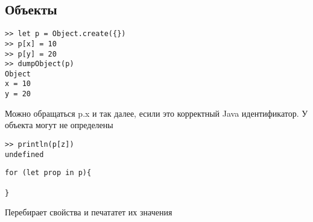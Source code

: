 \subsection{Объекты}

\begin{verbatim}
>> let p = Object.create({})
>> p[x] = 10
>> p[y] = 20
>> dumpObject(p)
Object
x = 10 
y = 20
\end{verbatim}

Можно обращаться p.x  и так далее, есили это корректный Java идентификатор. У объекта могут не определены

\begin{verbatim}
>> println(p[z])
undefined
\end{verbatim}

\begin{verbatim}
for (let prop in p){

}
\end{verbatim}

Перебирает свойства и печататет их значения

